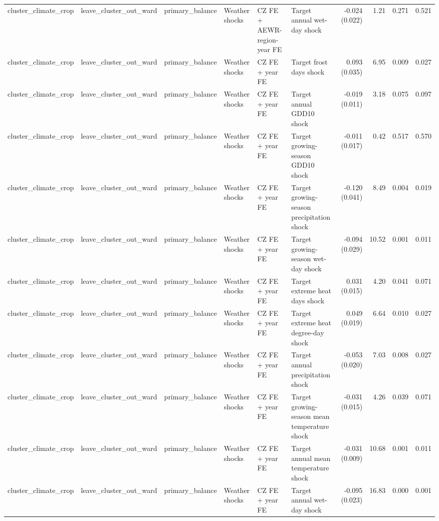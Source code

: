 \begin{tabular}{llllllrrrr}
cluster_climate_crop & leave_cluster_out_ward & primary_balance & Weather shocks & CZ FE + AEWR-region-year FE & Target annual wet-day shock & -0.024 (0.022) & 1.21 & 0.271 & 0.521 \\
cluster_climate_crop & leave_cluster_out_ward & primary_balance & Weather shocks & CZ FE + year FE & Target frost days shock & 0.093 (0.035) & 6.95 & 0.009 & 0.027 \\
cluster_climate_crop & leave_cluster_out_ward & primary_balance & Weather shocks & CZ FE + year FE & Target annual GDD10 shock & -0.019 (0.011) & 3.18 & 0.075 & 0.097 \\
cluster_climate_crop & leave_cluster_out_ward & primary_balance & Weather shocks & CZ FE + year FE & Target growing-season GDD10 shock & -0.011 (0.017) & 0.42 & 0.517 & 0.570 \\
cluster_climate_crop & leave_cluster_out_ward & primary_balance & Weather shocks & CZ FE + year FE & Target growing-season precipitation shock & -0.120 (0.041) & 8.49 & 0.004 & 0.019 \\
cluster_climate_crop & leave_cluster_out_ward & primary_balance & Weather shocks & CZ FE + year FE & Target growing-season wet-day shock & -0.094 (0.029) & 10.52 & 0.001 & 0.011 \\
cluster_climate_crop & leave_cluster_out_ward & primary_balance & Weather shocks & CZ FE + year FE & Target extreme heat days shock & 0.031 (0.015) & 4.20 & 0.041 & 0.071 \\
cluster_climate_crop & leave_cluster_out_ward & primary_balance & Weather shocks & CZ FE + year FE & Target extreme heat degree-day shock & 0.049 (0.019) & 6.64 & 0.010 & 0.027 \\
cluster_climate_crop & leave_cluster_out_ward & primary_balance & Weather shocks & CZ FE + year FE & Target annual precipitation shock & -0.053 (0.020) & 7.03 & 0.008 & 0.027 \\
cluster_climate_crop & leave_cluster_out_ward & primary_balance & Weather shocks & CZ FE + year FE & Target growing-season mean temperature shock & -0.031 (0.015) & 4.26 & 0.039 & 0.071 \\
cluster_climate_crop & leave_cluster_out_ward & primary_balance & Weather shocks & CZ FE + year FE & Target annual mean temperature shock & -0.031 (0.009) & 10.68 & 0.001 & 0.011 \\
cluster_climate_crop & leave_cluster_out_ward & primary_balance & Weather shocks & CZ FE + year FE & Target annual wet-day shock & -0.095 (0.023) & 16.83 & 0.000 & 0.001 \\

\end{tabular}
